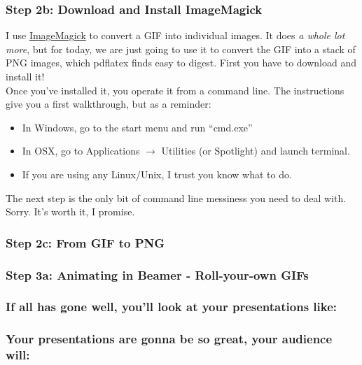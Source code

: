 \documentclass{beamer}
\begin{document}
\begin{frame}
	\frametitle{Step 2b: Download and Install ImageMagick}
	I use \href{https://www.imagemagick.org/script/binary-releases.php}{ImageMagick} to convert a GIF into individual images. It does \emph{a whole lot more}, but for today, we are just going to use it to convert the GIF into a stack of PNG images, which pdflatex finds easy to digest. First you have to download and install it! \\
	Once you've installed it, you operate it from a command line. The instructions give you a first walkthrough, but as a reminder:
		\begin{itemize}
			\item In Windows, go to the start menu and run ``cmd.exe''
			\item In OSX, go to Applications $\rightarrow$ Utilities (or Spotlight) and launch terminal.
			\item If you are using any Linux/Unix, I trust you know what to do.
		\end{itemize}
	The next step is the only bit of command line messiness you need to deal with. Sorry. It's worth it, I promise.
\end{frame}

\begin{frame}
	\frametitle{Step 2c: From GIF to PNG}
	
	
\end{frame}


\begin{frame}
	\frametitle{Step 3a: Animating in Beamer - Roll-your-own GIFs}
	
\end{frame}



\begin{frame}
	\frametitle{If all has gone well, you'll look at your presentations like:}
	\begin{center}
	\end{center}
\end{frame}

\begin{frame}
	\frametitle{Your presentations are gonna be so great, your audience will:}
	\begin{center}
	\end{center}
\end{frame}
\end{document}
